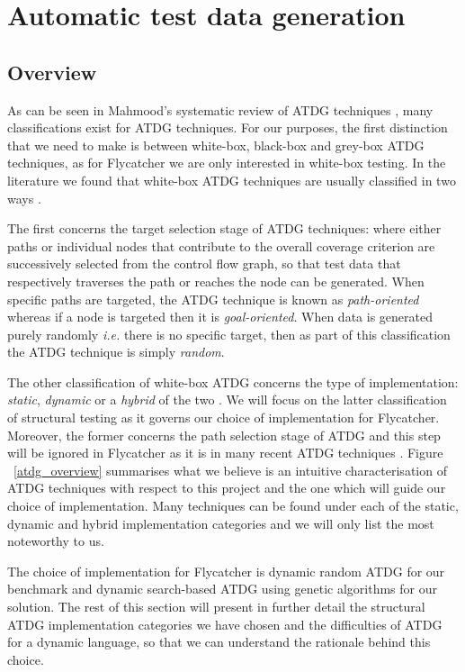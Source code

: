 \documentclass[a4paper,11pt,titlepage]{report}
\begin{document}
\section{Automatic test data generation}
\subsection{Overview}

As can be seen in Mahmood's systematic review of ATDG techniques \cite{mahmood2007systematic}, many classifications exist for ATDG techniques. For our purposes, the first distinction that we need to make is between white-box, black-box \cite{prasanna2005survey} and grey-box ATDG techniques, as for Flycatcher we are only interested in white-box testing. In the literature we found that white-box ATDG techniques are usually classified in two ways \cite{mahmood2007systematic, edvardsson1999survey, tahbildar2automated}.

The first concerns the target selection stage of ATDG techniques: where either paths or individual nodes that contribute to the overall coverage criterion are successively selected from the control flow graph, so that test data that respectively traverses the path or reaches the node can be generated. When specific paths are targeted, the ATDG technique is known as \emph{path-oriented} \cite{edvardsson1999survey} whereas if a node is targeted then it is \emph{goal-oriented}. When data is generated purely randomly \emph{i.e.} there is no specific target, then as part of this classification the ATDG technique is simply \emph{random}.

The other classification of white-box ATDG concerns the type of implementation: \emph{static}, \emph{dynamic} or a \emph{hybrid} of the two \cite{han2008empirical, mcminn2004search}. We will focus on the latter classification of structural testing as it governs our choice of implementation for Flycatcher. Moreover, the former concerns the path selection stage of ATDG and this step will be ignored in Flycatcher as it is in many recent ATDG techniques \cite{tahbildar2automated}. Figure ~\ref{atdg_overview} summarises what we believe is an intuitive characterisation of ATDG techniques with respect to this project and the one which will guide our choice of implementation. Many techniques can be found under each of the static, dynamic and hybrid implementation categories and we will only list the most noteworthy to us.

The choice of implementation for Flycatcher is dynamic random ATDG for our benchmark and dynamic search-based ATDG using genetic algorithms for our solution. The rest of this section will present in further detail the structural ATDG implementation categories we have chosen and the difficulties of ATDG for a dynamic language, so that we can understand the rationale behind this choice.
\end{document}
